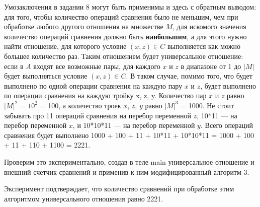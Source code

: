 \documentclass[12pt]{article}
\begin{document}
	Умозаключения в задании 8 могут быть применимы и здесь с обратным выводом: для того, чтобы количество операций сравнения было не меньшим, чем при обработке любого другого отношения на множестве $M$, для искомого значения количество операций сравнения должно быть {\bf наибольшим}, а для этого нужно найти отношение, для которого условие $(x, z) \in C$ выполняется как можно большее количество раз. Таким отношением будет универсальное отношение: если в $A$ входят все возможные пары, для каждого $x$ и $z$ в диапазоне от 1 до $|M|$ будет выполняться условие $(x, z) \in C$. В таком случае, помимо того, что будет выполнено по одной операции сравнения на каждую пару $x$ и $z$, будет выполнено по операции сравнения на каждую тройку x, z, y. Количество пар $x$ и $z$ равно $|M|^2$ = $10^2$ = 100, а количество троек $x$, $z$, $y$ равно $|M|^3$ = 1000. Не стоит забывать про 11 операций сравнения на перебор переменной $z$, 10*11 --- на перебор переменной $x$, и 10*10*11 --- на перебор переменной $y$. Всего операций сравнения будет выполнено 1000 + 100 + 11 + 10*11 + 10*10*11 = 1000 + 100 + 11 + 110 + 1100 = 2221.
	
	Проверим это экспериментально, создав в теле main универсальное отношение и внешний счетчик сравнений и применив к ним модифицированный алгоритм 3.
	
	 
	
	\newpage
	
	\begin{figure}[h]
		\noindent{}
	\end{figure}
	
	Эксперимент подтверждает, что количество сравнений при обработке этим алгоритмом универсального отношения равно 2221.
	
\end{document}
